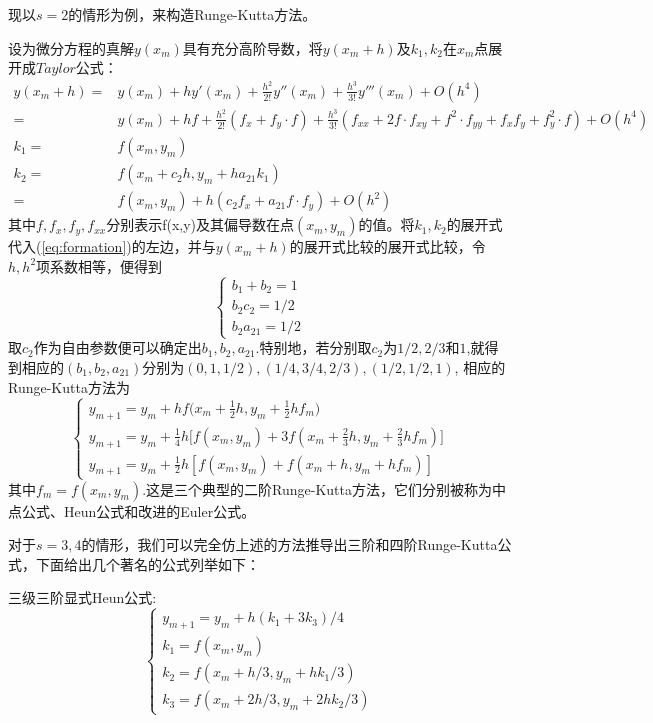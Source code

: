 现以$s=2$的情形为例，来构造Runge-Kutta方法。

设为微分方程的真解$y(x_m)$具有充分高阶导数，将$y(x_m+h)$及$k_1,k_2$在$x_m$点展开成$Taylor$公式：
\begin{equation*}
		\begin{aligned}
				y(x_m+h) =& y(x_m) +hy'(x_m) +\frac{h^2}{2!}y''(x_m)+\frac{h^3}{3!}y'''(x_m)+O(h^4)\\
				= & y(x_m)+hf+\frac{h^2}{2!}(f_x+f_y \cdot f)+\frac{h^3}{3!}(f_{xx}+2f \cdot f_{xy}+f^2 \cdot f_{yy}+f_x f_y +f^2_y \cdot f)+O(h^4)\\
				k_1=&f(x_m,y_m)\\
				k_2= &f(x_m+c_2h,y_m+ha_{21}k_1)\\
				= & f(x_m,y_m)+h(c_2 f_x+a_{21}f \cdot f_y) + O(h^2)
		\end{aligned}
\end{equation*}
其中$f,f_x,f_y,f_{xx}$分别表示f(x,y)及其偏导数在点$(x_m,y_m)$的值。将$k_1,k_2$的展开式代入(\ref{eq:formation})的左边，并与$y(x_m+h)$的展开式比较的展开式比较，令$h,h^2$项系数相等，便得到
\begin{equation*}
		\begin{cases}
				b_1+b_2=1\\
				b_2c_2=1/2\\
				b_2a_{21}=1/2
		\end{cases}
\end{equation*}
取$c_2$作为自由参数便可以确定出$b_1,b_2,a_{21}$.特别地，若分别取$c_2$为$1/2,2/3$和$1$,就得到相应的$(b_1,b_2,a_{21})$分别为$(0,1,1/2),(1/4,3/4,2/3),(1/2,1/2,1)$, 相应的Runge-Kutta方法为
\begin{equation*}
		\begin{cases}
				y_{m+1} =y_m +h f\bigg(x_m+\frac{1}{2}h, y_m+\frac{1}{2}hf_m\bigg)\\
				y_{m+1} =y_m +\frac{1}{4}h\bigg[ f(x_m,y_m)+3f(x_m+\frac{2}{3}h, y_m+\frac{2}{3}hf_m)\bigg]\\
				y_{m+1} =y_m +\frac{1}{2}h [f(x_m,y_m)+f(x_m+h,y_m+hf_m)]
		\end{cases}
\end{equation*}
其中$f_m=f(x_m,y_m)$.这是三个典型的二阶Runge-Kutta方法，它们分别被称为中点公式、Heun公式和改进的Euler公式。

对于$s=3,4$的情形，我们可以完全仿上述的方法推导出三阶和四阶Runge-Kutta公式，下面给出几个著名的公式列举如下：

三级三阶显式Heun公式:
\begin{equation*}\label{eq:Heun_3}
		\begin{cases}
				y_{m+1}=y_m + h(k_1+3k_3)/4\\
				k_1=f(x_m,y_m)\\
				k_2=f(x_m+h/3,y_m+hk_1/3)\\
				k_3=f(x_m+2h/3,y_m+2hk_2/3)
		\end{cases}
\end{equation*}

